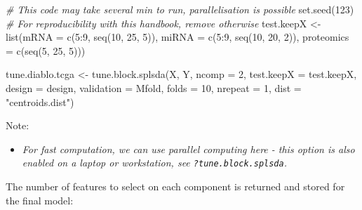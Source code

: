 \documentclass[
]{book}
\newenvironment{Shaded}{\begin{snugshade}}{\end{snugshade}}
\newcommand{\AttributeTok}[1]{\textcolor[rgb]{0.77,0.63,0.00}{#1}}
\newcommand{\CommentTok}[1]{\textcolor[rgb]{0.56,0.35,0.01}{\textit{#1}}}
\newcommand{\DecValTok}[1]{\textcolor[rgb]{0.00,0.00,0.81}{#1}}
\newcommand{\FunctionTok}[1]{\textcolor[rgb]{0.00,0.00,0.00}{#1}}
\newcommand{\NormalTok}[1]{#1}
\newcommand{\OtherTok}[1]{\textcolor[rgb]{0.56,0.35,0.01}{#1}}
\newcommand{\SpecialCharTok}[1]{\textcolor[rgb]{0.00,0.00,0.00}{#1}}
\newcommand{\StringTok}[1]{\textcolor[rgb]{0.31,0.60,0.02}{#1}}
\providecommand{\tightlist}{%
  \setlength{\itemsep}{0pt}\setlength{\parskip}{0pt}}
\begin{document}
\begin{Shaded}
\begin{Highlighting}[]
\CommentTok{\# This code may take several min to run, parallelisation is possible}
\FunctionTok{set.seed}\NormalTok{(}\DecValTok{123}\NormalTok{) }\CommentTok{\# For reproducibility with this handbook, remove otherwise}
\NormalTok{test.keepX }\OtherTok{\textless{}{-}} \FunctionTok{list}\NormalTok{(}\AttributeTok{mRNA =} \FunctionTok{c}\NormalTok{(}\DecValTok{5}\SpecialCharTok{:}\DecValTok{9}\NormalTok{, }\FunctionTok{seq}\NormalTok{(}\DecValTok{10}\NormalTok{, }\DecValTok{25}\NormalTok{, }\DecValTok{5}\NormalTok{)),}
                   \AttributeTok{miRNA =} \FunctionTok{c}\NormalTok{(}\DecValTok{5}\SpecialCharTok{:}\DecValTok{9}\NormalTok{, }\FunctionTok{seq}\NormalTok{(}\DecValTok{10}\NormalTok{, }\DecValTok{20}\NormalTok{, }\DecValTok{2}\NormalTok{)),}
                   \AttributeTok{proteomics =} \FunctionTok{c}\NormalTok{(}\FunctionTok{seq}\NormalTok{(}\DecValTok{5}\NormalTok{, }\DecValTok{25}\NormalTok{, }\DecValTok{5}\NormalTok{)))}

\NormalTok{tune.diablo.tcga }\OtherTok{\textless{}{-}} \FunctionTok{tune.block.splsda}\NormalTok{(X, Y, }\AttributeTok{ncomp =} \DecValTok{2}\NormalTok{, }
                              \AttributeTok{test.keepX =}\NormalTok{ test.keepX, }\AttributeTok{design =}\NormalTok{ design,}
                              \AttributeTok{validation =} \StringTok{\textquotesingle{}Mfold\textquotesingle{}}\NormalTok{, }\AttributeTok{folds =} \DecValTok{10}\NormalTok{, }\AttributeTok{nrepeat =} \DecValTok{1}\NormalTok{, }
                              \AttributeTok{dist =} \StringTok{"centroids.dist"}\NormalTok{)}
\end{Highlighting}
\end{Shaded}

Note:

\begin{itemize}
\tightlist
\item
  \emph{For fast computation, we can use parallel computing here - this option is also enabled on a laptop or workstation, see \texttt{?tune.block.splsda}.}
\end{itemize}

The number of features to select on each component is returned and stored for the final model:

\begin{Shaded}
\end{Shaded}
\end{document}
